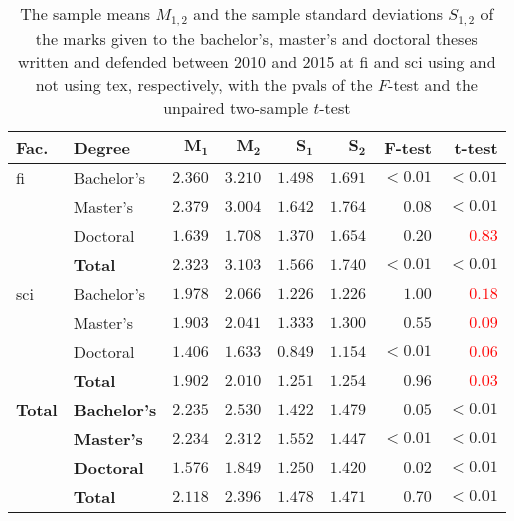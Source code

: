 \begin{table}
  \caption{The sample means $M_{1,2}$ and the sample standard deviations $S_{1,2}$ of the marks given to the bachelor's, master's and doctoral theses written and defended between 2010 and 2015 at \acrshort{fi} and \acrshort{sci} using and not using \gls{tex}, respectively, with the \glspl{pval} of the $F$-test and the unpaired two-sample $t$-test}
  \begin{tabularx}{\textwidth}{Xlrrrrrr}
      \bf Fac. & \bf Degree & $\mathbf{M_1}$ & $\mathbf{M_2}$ & $\mathbf{S_1}$ & $\mathbf{S_2}$ & \bf F-test & \bf t-test \\
    \hline
    \acrshort{fi}  %
      & Bachelor's & $2.360$ & $3.210$ & $1.498$ & $1.691$ & $<0.01$ & \textcolor{OliveGreen}{$<0.01$} \\
      & Master's   & $2.379$ & $3.004$ & $1.642$ & $1.764$ & $0.08$ & \textcolor{OliveGreen}{$<0.01$} \\
      & Doctoral   & $1.639$ & $1.708$ & $1.370$ & $1.654$ & $0.20$ & \textcolor{red}{$0.83$} \\
      & \textbf{Total}      & $\mathbf{2.323}$ & $\mathbf{3.103}$ \bf & $\mathbf{1.566}$ & $\mathbf{1.740}$ & $\mathbf{<0.01}$ & \textcolor{OliveGreen}{$\mathbf{<0.01}$}\\

    \acrshort{sci} %
      & Bachelor's & $1.978$ & $2.066$ & $1.226$ & $1.226$ & $1.00$ & \textcolor{red}{$0.18$} \\
      & Master's   & $1.903$ & $2.041$ & $1.333$ & $1.300$ & $0.55$ & \textcolor{red}{$0.09$} \\
      & Doctoral   & $1.406$ & $1.633$ & $0.849$ & $1.154$ & $<0.01$ & \textcolor{red}{$0.06$} \\

      & \textbf{Total}      & $\mathbf{1.902}$ & $\mathbf{2.010}$ & $\mathbf{1.251}$ & $\mathbf{1.254}$ & $\mathbf{0.96}$ & \textcolor{red}{$\mathbf{0.03}$} \\
    \hline
    \textbf{Total} 
    & \textbf{Bachelor's} & $\mathbf{2.235}$ & $\mathbf{2.530}$ & $\mathbf{1.422}$ & $\mathbf{1.479}$ & $\mathbf{0.05}$  & \textcolor{OliveGreen}{$\mathbf{<0.01}$} \\
    & \textbf{Master's} & $\mathbf{2.234}$ & $\mathbf{2.312}$ & $\mathbf{1.552}$ & $\mathbf{1.447}$ & $\mathbf{<0.01}$ & \textcolor{OliveGreen}{$\mathbf{<0.01}$} \\
    & \textbf{Doctoral} & $\mathbf{1.576}$ & $\mathbf{1.849}$ & $\mathbf{1.250}$ & $\mathbf{1.420}$ & $\mathbf{0.02}$ & \textcolor{OliveGreen}{$\mathbf{<0.01}$} \\
    & \textbf{Total}    & $\mathbf{2.118}$ & $\mathbf{2.396}$ & $\mathbf{1.478}$ & $\mathbf{1.471}$ & $\mathbf{0.70}$ & \textcolor{OliveGreen}{$\mathbf{<0.01}$} \\
  \end{tabularx}
  \label{table:statistics-tex-marks}
\end{table}

